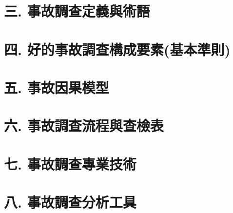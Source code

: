 \documentclass[
  letterpaper,
  DIV=11,
  numbers=noendperiod]{scrreprt}
\begin{document}
\section*{三.
事故調查定義與術語}\label{ux4e09.-ux4e8bux6545ux8abfux67e5ux5b9aux7fa9ux8207ux8853ux8a9e}


\section*{四.
好的事故調查構成要素(基本準則)}\label{ux56db.-ux597dux7684ux4e8bux6545ux8abfux67e5ux69cbux6210ux8981ux7d20ux57faux672cux6e96ux5247}


\section*{五.
事故因果模型}\label{ux4e94.-ux4e8bux6545ux56e0ux679cux6a21ux578b}


\section*{六.
事故調查流程與查檢表}\label{ux516d.-ux4e8bux6545ux8abfux67e5ux6d41ux7a0bux8207ux67e5ux6aa2ux8868}


\section*{七.
事故調查專業技術}\label{ux4e03.-ux4e8bux6545ux8abfux67e5ux5c08ux696dux6280ux8853}


\section*{八.
事故調查分析工具}\label{ux516b.-ux4e8bux6545ux8abfux67e5ux5206ux6790ux5de5ux5177}

\end{document}
